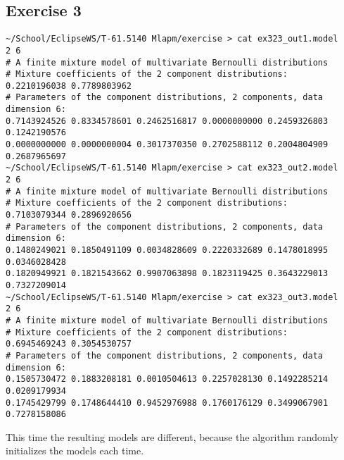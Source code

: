 \documentclass[a4paper,oneside,article]{memoir}
\begin{document}
\subsection*{Exercise 3}
\begin{lstlisting}
~/School/EclipseWS/T-61.5140 Mlapm/exercise > cat ex323_out1.model 
2 6
# A finite mixture model of multivariate Bernoulli distributions
# Mixture coefficients of the 2 component distributions:
0.2210196038 0.7789803962 
# Parameters of the component distributions, 2 components, data dimension 6:
0.7143924526 0.8334578601 0.2462516817 0.0000000000 0.2459326803 0.1242190576 
0.0000000000 0.0000000004 0.3017370350 0.2702588112 0.2004804909 0.2687965697 
~/School/EclipseWS/T-61.5140 Mlapm/exercise > cat ex323_out2.model 
2 6
# A finite mixture model of multivariate Bernoulli distributions
# Mixture coefficients of the 2 component distributions:
0.7103079344 0.2896920656 
# Parameters of the component distributions, 2 components, data dimension 6:
0.1480249021 0.1850491109 0.0034828609 0.2220332689 0.1478018995 0.0346028428 
0.1820949921 0.1821543662 0.9907063898 0.1823119425 0.3643229013 0.7327209014
~/School/EclipseWS/T-61.5140 Mlapm/exercise > cat ex323_out3.model 
2 6
# A finite mixture model of multivariate Bernoulli distributions
# Mixture coefficients of the 2 component distributions:
0.6945469243 0.3054530757 
# Parameters of the component distributions, 2 components, data dimension 6:
0.1505730472 0.1883208181 0.0010504613 0.2257028130 0.1492285214 0.0209179934 
0.1745429799 0.1748644410 0.9452976988 0.1760176129 0.3499067901 0.7278158086
\end{lstlisting}
This time the resulting models are different, because the algorithm randomly initializes the 
models each time.
\end{document}
